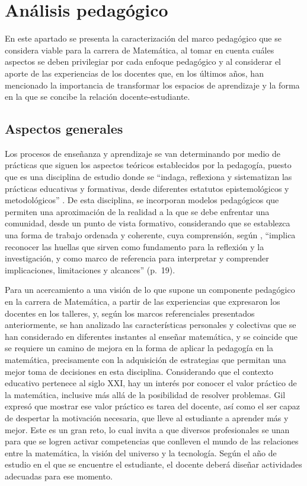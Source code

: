 
\section{Análisis pedagógico}

En este apartado se presenta la caracterización del marco pedagógico que se considera viable para la carrera de Matemática, al tomar en cuenta cuáles aspectos se deben privilegiar por cada enfoque pedagógico y al considerar el aporte de las experiencias de los docentes que, en los últimos años, han mencionado la importancia de transformar los espacios de aprendizaje y la forma en la que se concibe la relación docente-estudiante. 

\subsection{Aspectos generales}

Los procesos de enseñanza y aprendizaje se van determinando por medio de prácticas que siguen los aspectos teóricos establecidos por la pedagogía, puesto que es una disciplina de estudio donde se “indaga, reflexiona y sistematizan las prácticas educativas y formativas, desde diferentes estatutos epistemológicos y metodológicos” \cite[p.~10]{AriasFrancis2011}. De esta disciplina, se incorporan modelos pedagógicos que permiten una aproximación de la realidad a la que se debe enfrentar una comunidad, desde un punto de vista formativo, considerando que se establezca una forma de trabajo ordenada y coherente, cuya comprensión, según \cite{AriasFrancis2011}, “implica reconocer las huellas que sirven como fundamento para la reflexión y la investigación, y como marco de referencia para interpretar y comprender implicaciones, limitaciones y alcances” (p.~19).

Para un acercamiento a una visión de lo que supone un componente pedagógico en la carrera de Matemática, a partir de las experiencias que expresaron los docentes en los talleres, y, según los marcos referenciales presentados anteriormente, se han analizado las características personales y colectivas que se han considerado en diferentes instantes al enseñar matemática, y se coincide que se requiere un camino de mejora en la forma de aplicar la pedagogía en la matemática, precisamente con la adquisición de estrategias que permitan una mejor toma de decisiones en esta disciplina.  
Considerando que el contexto educativo pertenece al siglo XXI, hay un interés por conocer el valor práctico de la matemática, inclusive más allá de la posibilidad de resolver problemas. Gil \cite{gil2005reflexiones} expresó que mostrar ese valor práctico es tarea del docente, así como el ser capaz de despertar la motivación necesaria, que lleve al estudiante a aprender más y mejor. Este es un gran reto, lo cual invita a que diversos profesionales se unan para que se logren activar competencias que conlleven el mundo de las relaciones entre la matemática, la visión del universo y la tecnología. Según el año de estudio en el que se encuentre el estudiante, el docente deberá diseñar actividades adecuadas para ese momento.  


